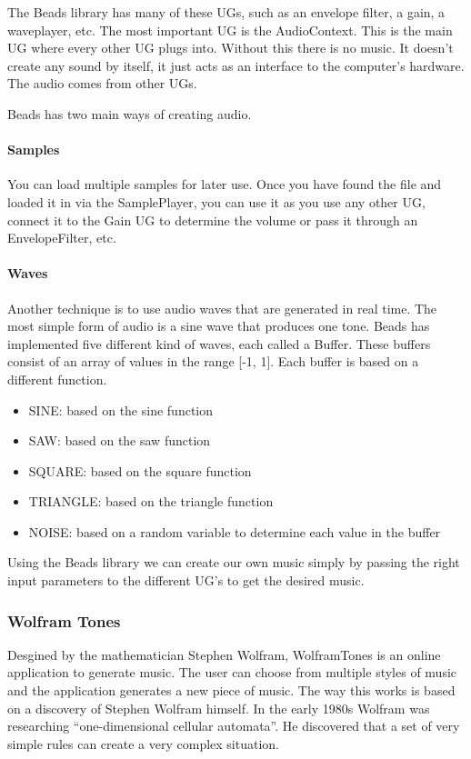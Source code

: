 \documentclass[12pt]{article}
\begin{document}
The Beads library has many of these UGs, such as an envelope filter, a gain, a waveplayer, etc. The most important UG is the AudioContext. This is the main UG where every other UG plugs into. Without this there is no music. It doesn't create any sound by itself, it just acts as an interface to the computer's hardware. The audio comes from other UGs.
\newline

Beads has two main ways of creating audio.

\paragraph{Samples}

You can load multiple samples for later use. Once you have found the file and loaded it in via the SamplePlayer, you can use it as you use any other UG, connect it to the Gain UG to determine the volume or pass it through an EnvelopeFilter, etc.  

\paragraph{Waves}

Another technique is to use audio waves that are generated in real time. The most simple form of audio is a sine wave that produces one tone. Beads has implemented five different kind of waves, each called a Buffer. These buffers consist of an array of values in the range [-1, 1]. Each buffer is based on a different function.
\begin{itemize}
\item SINE:  based on the sine function
\item SAW: based on the saw function
\item SQUARE: based on the square function
\item TRIANGLE: based on the triangle function
\item NOISE: based on a random variable to determine each value in the buffer
\end{itemize} 

Using the Beads library we can create our own music simply by passing the right input parameters to the different UG's to get the desired music.

\subsubsection{Wolfram Tones}

Desgined by the mathematician Stephen Wolfram, WolframTones is an online application to generate music. The user can choose from multiple styles of music and the application generates a new piece of music. The way this works is based on a discovery of Stephen Wolfram himself. In the early 1980s Wolfram was researching ``one-dimensional cellular automata''. He discovered that a set of very simple rules can create a very complex situation. 
\newline
\end{document}
